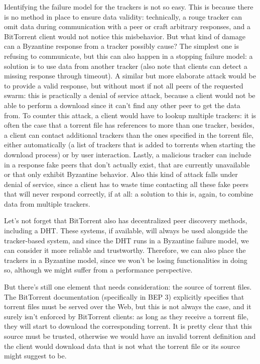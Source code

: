 \documentclass[mscthesis]{usiinfthesis}
\begin{document}
Identifying the failure model for the trackers is not so easy. This is because there is no method in place to ensure data validity: technically, a rouge tracker can omit data during communication with a peer or craft arbitrary responses, and a BitTorrent client would not notice this misbehavior. But what kind of damage can a Byzantine response from a tracker possibly cause? The simplest one is refusing to communicate, but this can also happen in a stopping failure model: a solution is to use data from another tracker (also note that clients can detect a missing response through timeout). A similar but more elaborate attack would be to provide a valid response, but without most if not all peers of the requested swarm: this is practically a denial of service attack, because a client would not be able to perform a download since it can't find any other peer to get the data from. To counter this attack, a client would have to lookup multiple trackers: it is often the case that a torrent file has references to more than one tracker, besides, a client can contact additional trackers than the ones specified in the torrent file, either automatically (a list of trackers that is added to torrents when starting the download process) or by user interaction. Lastly, a malicious tracker can include in a response fake peers that don't actually exist, that are currently unavailable or that only exhibit Byzantine behavior. Also this kind of attack falls under denial of service, since a client has to waste time contacting all these fake peers that will never respond correctly, if at all: a solution to this is, again, to combine data from multiple trackers.

Let's not forget that BitTorrent also has decentralized peer discovery methods, including a DHT. These systems, if available, will always be used alongside the tracker-based system, and since the DHT runs in a Byzantine failure model, we can consider it more reliable and trustworthy. Therefore, we can also place the trackers in a Byzantine model, since we won't be losing functionalities in doing so, although we might suffer from a performance perspective.

But there's still one element that needs consideration: the source of torrent files. The BitTorrent documentation (specifically in BEP 3) explicitly specifies that torrent files must be served over the Web, but this is not always the case, and it surely isn't enforced by BitTorrent clients: as long as they receive a torrent file, they will start to download the corresponding torrent. It is pretty clear that this source must be trusted, otherwise we would have an invalid torrent definition and the client would download data that is not what the torrent file or its source might suggest to be. %
\end{document}
